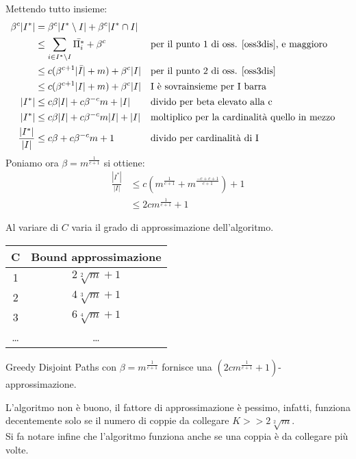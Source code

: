 Mettendo tutto insieme: 
\begin{equation}
    \begin{aligned}
        \beta^c|I^*| &= \beta^c|I^* \setminus I| + \beta^c|I^* \cap I|\\
        &\leq \sum_{i \in I^* \setminus I} \bar{\Pi_i^*} + \beta^c && \text{per il punto 1 di oss. \ref{oss3dis}, e maggioro}\\
        &\leq c(\beta^{c+1}|\bar{I}| + m) + \beta^c |I|&& \text{per il punto 2 di oss. \ref{oss3dis}}\\
        &\leq c(\beta^{c+1}|I| + m) + \beta^c |I|&& \text{I è sovrainsieme per I barra}\\
        |I^*| &\leq c\beta|I| + c\beta^{-c}m + |I|&& \text{divido per beta elevato alla c}\\
        |I^*| &\leq c\beta|I| + c\beta^{-c }m|I| + |I|&& \text{moltiplico per la cardinalità quello in mezzo}\\
        \frac{|I^*|}{|I|} &\leq c\beta + c\beta^{-c}m + 1&& \text{divido per cardinalità di I}
    \end{aligned}
\end{equation}
Poniamo ora $\beta = m^{\frac{1}{c+1}}$ si ottiene:
\begin{equation}
    \begin{aligned}
        \frac{|I^*|}{|I|} &\leq c(m^{\frac{1}{c+1}} + m^{\frac{-c+c+1}{c+1}}) + 1\\
        &\leq 2cm^{\frac{1}{c+1}} +1
    \end{aligned}
\end{equation}

Al variare di $C$ varia il grado di approssimazione dell'algoritmo.
\begin{center}
    \begin{tabular}{ c c  }
     C & Bound approssimazione \\
     \hline 
     1 & $2\sqrt[2]{m} + 1$ \\  
     2 & $4\sqrt[3]{m} + 1$ \\  
     3 & $6\sqrt[4]{m} + 1$ \\  
    \dots & \dots
    \end{tabular}
\end{center}
\begin{theorem}
    Greedy Disjoint Paths con  $\beta = m^{\frac{1}{c+1}}$ fornisce una $(2cm^{\frac{1}{c+1}} +1)$-approssimazione.
\end{theorem}
\begin{remark}
    L'algoritmo non è buono, il fattore di approssimazione è pessimo, infatti, funziona decentemente solo 
    se il numero di coppie da collegare $K >> 2\sqrt[2]{m}$.\\
    Si fa notare infine che l'algoritmo funziona anche se una coppia è da collegare più volte.
\end{remark}

